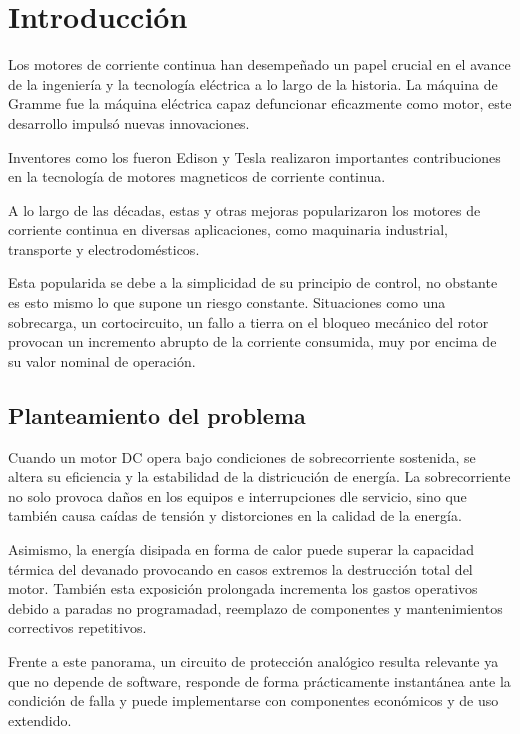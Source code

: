 \documentclass[conference]{IEEEtran}
\begin{document}
\section{Introducción}
Los motores de corriente continua han desempeñado un papel crucial en el avance de la ingeniería y la tecnología eléctrica a lo largo de la historia. La máquina de Gramme fue la máquina eléctrica capaz defuncionar eficazmente como motor, este desarrollo impulsó nuevas innovaciones.

Inventores como los fueron Edison y Tesla realizaron importantes contribuciones en la tecnología de motores magneticos de corriente continua.

A lo largo de las décadas, estas y otras mejoras popularizaron los motores de corriente continua en diversas aplicaciones, como maquinaria industrial, transporte y electrodomésticos.

Esta popularida se debe a la simplicidad de su principio de control, no obstante es esto mismo lo que supone un riesgo constante. Situaciones como una sobrecarga, un cortocircuito, un fallo a tierra on el bloqueo mecánico del rotor provocan un incremento abrupto de la corriente consumida, muy por encima de su valor nominal de operación.

\subsection{Planteamiento del problema}
Cuando un motor DC opera bajo condiciones de sobrecorriente sostenida, se altera su eficiencia y la estabilidad de la districución de energía. La sobrecorriente no solo provoca daños en los equipos e interrupciones dle servicio, sino que también causa caídas de tensión y distorciones en la calidad de la energía.

Asimismo, la energía disipada en forma de calor puede superar la capacidad térmica del devanado provocando en casos extremos la destrucción total del motor. 
También esta exposición prolongada incrementa los gastos operativos debido a paradas no programadad, reemplazo de componentes y mantenimientos correctivos repetitivos.

Frente a este panorama, un circuito de protección analógico resulta relevante ya que no depende de software, responde de forma prácticamente instantánea ante la condición de falla y puede implementarse con componentes económicos y de uso extendido.
\end{document}
